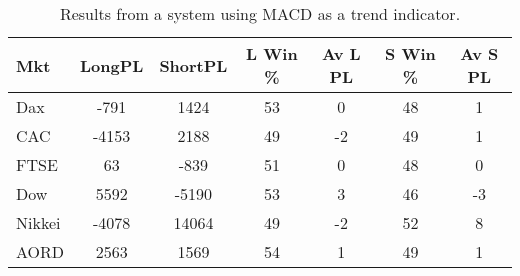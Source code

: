 \begin{table}[ht]
\centering
\caption[Results from a system using MACD as a trend indicator]{Results from a system using MACD as a trend indicator.} 
\label{tab:mac_trend_results}
\begin{tabular}{lcccccc}
  \toprule Mkt & LongPL & ShortPL & L Win \% & Av L PL & S Win \% & Av S PL \\ 
  \midrule Dax & -791 & 1424 & 53 & 0 & 48 & 1 \\ 
  CAC & -4153 & 2188 & 49 & -2 & 49 & 1 \\ 
  FTSE & 63 & -839 & 51 & 0 & 48 & 0 \\ 
  Dow & 5592 & -5190 & 53 & 3 & 46 & -3 \\ 
  Nikkei & -4078 & 14064 & 49 & -2 & 52 & 8 \\ 
  AORD & 2563 & 1569 & 54 & 1 & 49 & 1 \\ 
   \bottomrule \end{tabular}
\end{table}
